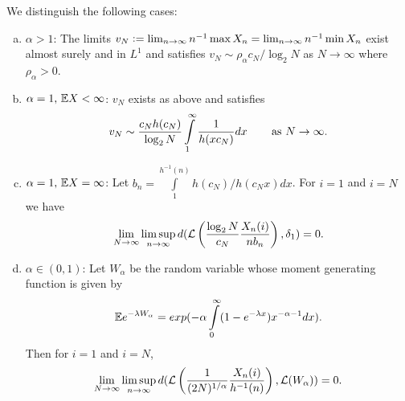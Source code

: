 \begin{theorem}\label{thm:poly_tails_result}
We distinguish the following cases:
\begin{enumerate}[(a)]

\item \vspace{-2mm} $\alpha > 1$: The limits $v_N \defeq \lim_{n \to \infty} n^{-1} \max X_n = \lim_{n \to \infty} n^{-1} \min X_n$ exist almost surely and in $L^1$ and satisfies $v_N \sim \rho_\alpha c_N / \log_2 N$ as $N \to \infty$ where $\rho_\alpha > 0$. \\

\item \vspace{-5mm} $\alpha = 1,\, \E X < \infty$: $v_N$ exists as above and satisfies 
\begin{equation}
v_N \sim \frac{c_N h(c_N)}{\log_2 N} \int\limits^\infty_1 \frac{1}{h(x c_N)} dx \qquad\,\text{as }N \to \infty. \\
\end{equation}

\item \vspace{-5mm} $\alpha = 1,\, \E X = \infty$: Let $b_n = \int\limits^{h^{-1}(n)}_{1} h(c_N)/h(c_N x) dx$. For $i=1$ and $i=N$ we have
\begin{equation}\nonumber
\lim\limits_{N \to \infty} \limsup\limits_{n \to \infty} d(\cal{L}\left( \frac{\log_2 N}{c_N}\frac{X_n(i)}{n b_n}\right), \delta_1) = 0. 
\end{equation}

\item \vspace{-4mm} $\alpha \in (0, 1)$: Let $W_\alpha$ be the random variable whose moment generating function is given by
\begin{equation}\nonumber
\E e^{-\lambda W_\alpha} = exp(- \alpha \int\limits^\infty_0 (1 - e^{-\lambda x})x^{-\alpha - 1}dx). 
\end{equation}
Then for $i=1$ and $i=N$, 
\begin{equation}\nonumber
\lim\limits_{N \to \infty} \limsup\limits_{n \to \infty} d(\cal{L}\left( \frac{1}{(2N)^{1/\alpha}}\frac{X_n(i)}{h^{-1}(n)}\right), \cal{L}(W_\alpha)) = 0. 
\end{equation}
\end{enumerate}
\end{theorem}

